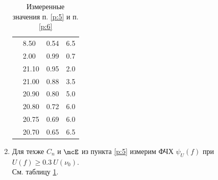 \documentclass{report}
\begin{document}
\begin{enumerate}
\begin{table}[H]
\begin{tabular}{l|lll}
			              & 8.50               & 0.54          & 6.5                \\
			              & 2.00               & 0.99          & 0.7                \\
			              & 21.10              & 0.95          & 2.0                \\
			              & 21.00              & 0.88          & 3.5                \\
			              & 20.90              & 0.80          & 5.0                \\
			              & 20.80              & 0.72          & 6.0                \\
			              & 20.75              & 0.69          & 6.0                \\
			              & 20.70              & 0.65          & 6.5                \\
		      \end{tabular}
		      \caption{Измеренные значения п. \ref{p:5} и п. \ref{p:6}}
		      \label{table:3}\label{table:4}
	      \end{table}

	\item \label{p:6} Для техже $ C_n $ и $ \mcE $ из пункта \ref{p:5} измерим ФЧХ
	      $\psi_U(f) $ при $ U(f) \ge 0.3\ U(\nu_0) $.\\
	      См. таблицу \ref{table:4}.


\end{enumerate}
\end{document}

